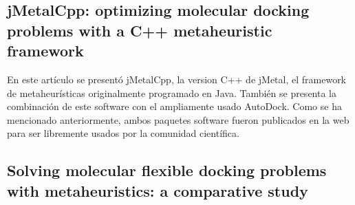 \subsection*{jMetalCpp: optimizing molecular docking problems with a C++ metaheuristic framework}

En este artículo se presentó jMetalCpp, la version C++ de jMetal, el framework de metaheurísticas originalmente programado en Java. También se presenta la combinación de este software con el ampliamente usado AutoDock. Como se ha mencionado anteriormente, ambos paquetes software fueron publicados en la web para ser libremente usados por la comunidad científica.



\subsection*{Solving molecular flexible docking problems with metaheuristics: a comparative study}


